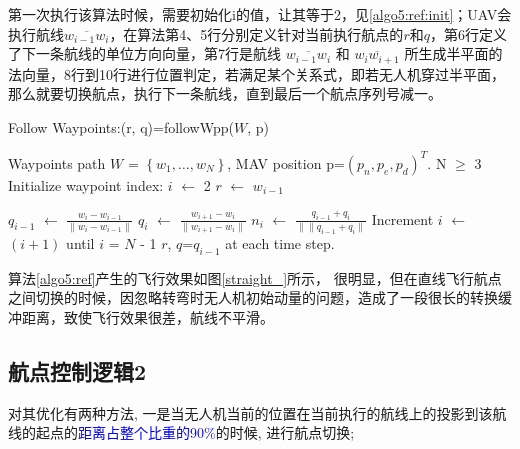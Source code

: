     第一次执行该算法时候，需要初始化i的值，让其等于2，见\ref{algo5:ref:init}；UAV会执行航线$\overline{w_{i-1}w_{i}}$，在算法第4、5行分别定义针对当前执行航点的$r$和$q$，第6行定义了下一条航线的单位方向向量，第7行是航线 $\overline{w_{i-1}w_{i}}$ 和 $\overline{w_{i}w_{i+1}}$ 所生成半平面的法向量，8行到10行进行位置判定，若满足某个关系式，即若无人机穿过半平面，
    那么就要切换航点，执行下一条航线，直到最后一个航点序列号减一。
    \begin{algorithm}[h]
            \caption{Follow Waypoints:(r, q)=followWpp($\textit{W}$, p)}
            \label{algo5:ref}
            \begin{algorithmic}[1]
                \ENSURE Waypoints path $\textit{W}$ = $\left\{ w_{1}, \dots, w_{N} \right\}$, MAV position p=$(p_{n}, p_{e}, p_{d})^{T}$.
                \REQUIRE N $\geq$ 3
                    \STATE Initialize waypoint index: $i$ $\gets$ 2
                    \label{algo5:ref:init}
                \ENDIF
                \STATE $r$ $\gets$ $w_{i-1}$

                \STATE $q_{i-1}$ $\gets$ $\frac{w_{i}-w_{i-1}}{\lVert w_{i}-w_{i-1} \rVert}$
                \STATE $q_{i}$ $\gets$ $\frac{w_{i+1}-w_{i}}{\lVert w_{i+1}-w_{i} \rVert}$
                \STATE $n_{i}$ $\gets$ $\frac{q_{i-1}+q_{i}}{\lVert \| q_{i-1}+q_{i} \rVert}$
                    \STATE Increment $i$ $\gets$ $\left(i+1\right)$ until $i$ = $N$ - 1
                \ENDIF
                \RETURN $r$, $q$=$q_{i-1}$ at each time step.  %
            \end{algorithmic}
        \end{algorithm}

        \par 算法\ref{algo5:ref}产生的飞行效果如图\ref{straight_}所示，
        很明显，但在直线飞行航点之间切换的时候，因忽略转弯时无人机初始动量的问题，造成了一段很长的转换缓冲距离，致使飞行效果很差，航线不平滑。
    \subsection{航点控制逻辑2}
        \par 对其优化有两种方法, 一是当无人机当前的位置在当前执行的航线上的投影到该航线的起点的\textcolor{blue}{距离占整个比重的90\%}的时候, 进行航点切换;
    
